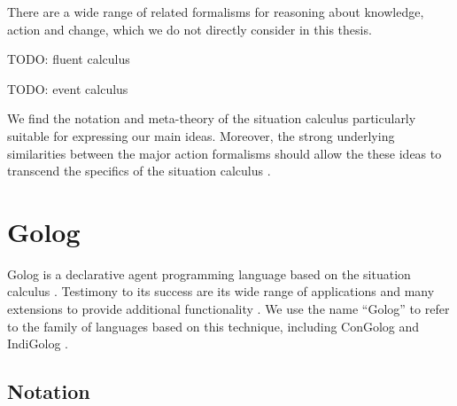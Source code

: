 There are a wide range of related formalisms for reasoning about knowledge,
action and change, which we do not directly consider in this thesis.

TODO: fluent calculus \citep{thielscher99fluentcalc}

TODO: event calculus \citep{kowalski86event_calculus}

We find the notation and meta-theory of the situation calculus particularly
suitable for expressing our main ideas. Moreover, the strong underlying
similarities between the major action formalisms should allow the
these ideas to transcend the specifics of the situation calculus \citet{thielscher06reconcile_sc_fc,thielscher07unifying_action_calculus,vanbentham07ml_sitcalc}.


\section{Golog\label{sec:Background:Golog}}

Golog is a declarative agent programming language based on the situation
calculus \citep{levesque97golog}. Testimony to its success are its
wide range of applications and many extensions to provide additional
functionality \citep{giacomo00congolog,giacomo99indigolog,Ferrein2005readylog}.
We use the name {}``Golog'' to refer to the family of languages
based on this technique, including ConGolog \citep{giacomo00congolog}
and IndiGolog \citep{giacomo99indigolog}.


\subsection{Notation}

